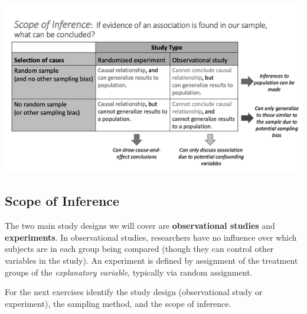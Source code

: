\documentclass[
]{report}
\begin{document}
\begin{center}\includegraphics[width=0.75\linewidth]{images/ScopeOfInferenceGreyscale} \end{center}

\subsection{Scope of Inference}\label{scope-of-inference-1}

The two main study designs we will cover are \textbf{observational studies} and \textbf{experiments}. In observational studies, researchers have no influence over which subjects are in each group being compared (though they can control other variables in the study). An experiment is defined by assignment of the treatment groups of the \emph{explanatory variable}, typically via random assignment.

For the next exercises identify the study design (observational study or experiment), the sampling method, and the scope of inference.
\end{document}
